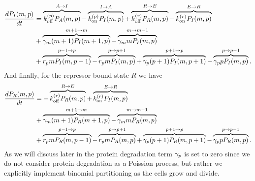 \begin{equation}
  \begin{aligned}
    \dt{P_I(m, p)} &=
    \overbrace{\kpoff P_A(m, p)}^{A \rightarrow I} %
    - \overbrace{\kpon P_I(m, p)}^{I \rightarrow A} %
    + \overbrace{\kroff P_R(m, p)}^{R \rightarrow E} %
    - \overbrace{\kron P_I(m, p)}^{E \rightarrow R}\\ %
    &+ \overbrace{\gm (m + 1) P_I(m+1 , p)}^{m+1 \rightarrow m} %
    - \overbrace{\gm m P_I(m , p)}^{m \rightarrow m-1}\\ %
    &+ \overbrace{r_p m P_I(m, p - 1)}^{p-1 \rightarrow p} %
    - \overbrace{r_p m P_I(m, p)}^{p \rightarrow p+1} %
    + \overbrace{\gp (p + 1) P_I(m, p + 1)}^{p + 1 \rightarrow p} %
    - \overbrace{\gp p P_I(m, p)}^{p \rightarrow p-1}. %
  \end{aligned}
\end{equation}
And finally, for the repressor bound state $R$ we have
\begin{equation}
  \begin{aligned}
    \dt{P_R(m, p)} &=
    - \overbrace{\kroff P_R(m, p)}^{R \rightarrow E} %
    + \overbrace{\kron P_I(m, p)}^{E \rightarrow R}\\ %
    &+ \overbrace{\gm (m + 1) P_R(m+1 , p)}^{m+1 \rightarrow m} %
    - \overbrace{\gm m P_R(m , p)}^{m \rightarrow m-1}\\ %
    &+ \overbrace{r_p m P_R(m, p - 1)}^{p-1 \rightarrow p} %
    - \overbrace{r_p m P_R(m, p)}^{p \rightarrow p+1} %
    + \overbrace{\gp (p + 1) P_R(m, p + 1)}^{p + 1 \rightarrow p} %
    - \overbrace{\gp p P_R(m, p)}^{p \rightarrow p-1}. %
  \end{aligned}
\end{equation}
As we will discuss later in  the protein degradation term
$\gamma _p$ is set to zero since we do not consider protein degradation as a Poission
process, but rather we explicitly implement binomial partitioning as the cells
grow and divide.

